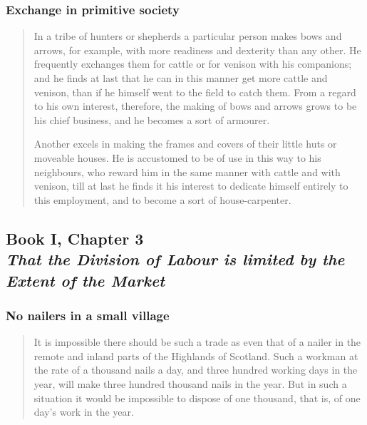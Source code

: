         \subsubsection{Exchange in primitive society}

            \begin{quote}
                In a tribe of hunters or shepherds a particular person makes bows and arrows, for example, with more readiness and dexterity than any other. He frequently exchanges them for cattle or for venison with his companions; and he finds at last that he can in this manner get more cattle and venison, than if he himself went to the field to catch them. From a regard to his own interest, therefore, the making of bows and arrows grows to be his chief business, and he becomes a sort of armourer.

                Another excels in making the frames and covers of their little huts or moveable houses. He is accustomed to be of use in this way to his neighbours, who reward him in the same manner with cattle and with venison, till at last he finds it his interest to dedicate himself entirely to this employment, and to become a sort of house-carpenter.
            \end{quote}

    \subsection[That the Division of Labour is limited by the Extent of the Market]{Book I, Chapter 3 \\
                \textit{That the Division of Labour is limited by the Extent of the Market}}

        \subsubsection{No nailers in a small village}

            \begin{quote}
                It is impossible there should be such a trade as even that of a nailer in the remote and inland parts of the Highlands of Scotland. Such a workman at the rate of a thousand nails a day, and three hundred working days in the year, will make three hundred thousand nails in the year. But in such a situation it would be impossible to dispose of one thousand, that is, of one day's work in the year.
            \end{quote}

